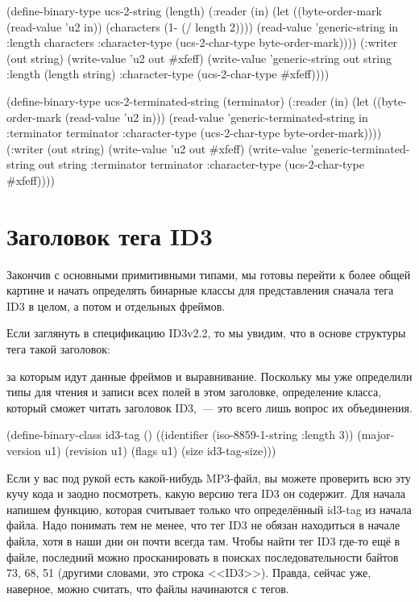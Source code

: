 \begin{myverb}
(define-binary-type ucs-2-string (length)
  (:reader (in)
    (let ((byte-order-mark (read-value 'u2 in))
          (characters (1- (/ length 2))))
      (read-value
       'generic-string in
       :length characters
       :character-type (ucs-2-char-type byte-order-mark))))
  (:writer (out string)
    (write-value 'u2 out #xfeff)
    (write-value
     'generic-string out string
     :length (length string)
     :character-type (ucs-2-char-type #xfeff))))

(define-binary-type ucs-2-terminated-string (terminator)
  (:reader (in)
    (let ((byte-order-mark (read-value 'u2 in)))
      (read-value
       'generic-terminated-string in
       :terminator terminator
       :character-type (ucs-2-char-type byte-order-mark))))
  (:writer (out string)
    (write-value 'u2 out #xfeff)
    (write-value 
     'generic-terminated-string out string
     :terminator terminator
     :character-type (ucs-2-char-type #xfeff))))
\end{myverb}

\section{Заголовок тега ID3}

Закончив с основными примитивными типами, мы готовы перейти к более общей картине и начать
определять бинарные классы для представления сначала тега ID3 в целом, а потом и отдельных
фреймов.

Если заглянуть в спецификацию ID3v2.2, то мы увидим, что в основе структуры тега такой заголовок:

за которым идут данные фреймов и выравнивание.  Поскольку мы уже определили типы для
чтения и записи всех полей в этом заголовке, определение класса, который сможет читать
заголовок ID3,~--- это всего лишь вопрос их объединения.

\begin{myverb}
(define-binary-class id3-tag ()
  ((identifier     (iso-8859-1-string :length 3))
   (major-version  u1)
   (revision       u1)
   (flags          u1)
   (size           id3-tag-size)))
\end{myverb}

Если у вас под рукой есть какой-нибудь MP3-файл, вы можете проверить всю эту кучу кода и
заодно посмотреть, какую версию тега ID3 он содержит. Для начала напишем функцию, которая
считывает только что определённый id3-tag из начала файла. Надо понимать тем не менее,
что тег ID3 не обязан находиться в начале файла, хотя в наши дни он почти всегда там.
Чтобы найти тег ID3 где-то ещё в файле, последний можно просканировать в поисках
последовательности байтов 73, 68, 51 (другими словами, это строка <<ID3>>). Правда, сейчас уже,
наверное, можно считать, что файлы начинаются с тегов.

